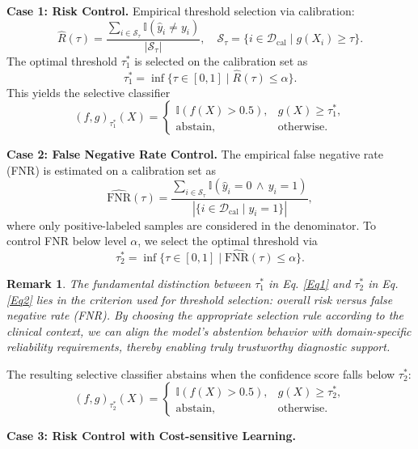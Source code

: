 \documentclass[journal,twoside,web]{ieeecolor}
\newtheorem{remark}[theorem]{Remark}
\begin{document}
\textbf{Case 1: Risk Control.}
Empirical threshold selection via calibration:
\[
\hat{R}(\tau)=\frac{\sum_{i\in\mathcal{S}_\tau}\mathbb{I}(\hat{y}_i \neq y_i)}{|\mathcal{S}_\tau|},
\quad
\mathcal{S}_\tau=\{i\in\mathcal{D}_{\mathrm{cal}}\mid g(X_i)\geq \tau\}.
\]
The optimal threshold $\tau_{1}^*$ is selected on the calibration set as
\begin{equation}\label{Eq1}
    \tau_{1}^*=\inf\{\tau \in[0,1]\mid\hat{R}(\tau)\leq\alpha\}.
\end{equation}
This yields the selective classifier
\[
(f,g)_{\tau_{1}^*}(X)=
\begin{cases}
\mathbb{I}\!\left(f(X)>0.5\right), & g(X)\geq \tau_{1}^*,\\[4pt]
\text{abstain}, & \text{otherwise}.
\end{cases}
\]

\textbf{Case 2: False Negative Rate Control.}
The empirical false negative rate (FNR) is estimated on a calibration set as
\[
\widehat{\mathrm{FNR}}(\tau)=\frac{\sum_{i \in\mathcal{S}_\tau}\mathbb{I}(\hat{y}_i=0\,\wedge\, y_i=1)}{|\{i\in\mathcal{D}_{\mathrm{cal}}\mid y_i=1\}|},
\]
where only positive-labeled samples are considered in the denominator. To control FNR below level $\alpha$, we select the optimal threshold via 
\begin{equation}\label{Eq2}
  \tau_{2}^*=\inf\{\tau\in[0,1]\mid \widehat{\mathrm{FNR}}(\tau)\leq\alpha\}.  
\end{equation}

\begin{remark}
The fundamental distinction between $\tau_{1}^{*}$ in Eq. \ref{Eq1} and $\tau_{2}^{*}$ in Eq. \ref{Eq2} lies in the criterion used for threshold selection: overall risk versus false negative rate (FNR). By choosing the appropriate selection rule according to the clinical context, we can align the model's abstention behavior with domain-specific reliability requirements, thereby enabling truly trustworthy diagnostic support.
\end{remark}

The resulting selective classifier abstains when the confidence score falls below $\tau_{2}^*$:
\[
(f,g)_{\tau_{2}^*}(X)=
\begin{cases}
\mathbb{I}\!\left(f(X)>0.5\right), & g(X)\geq \tau_{2}^*,\\[4pt]
\text{abstain}, & \text{otherwise}.
\end{cases}
\]


\textbf{Case 3: Risk Control with Cost-sensitive Learning.}
\end{document}
